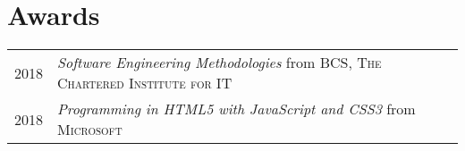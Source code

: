 \documentclass[a4paper,10pt]{article}
\begin{document}
\section{Awards}


\begin{tabular}{rl}
    \textsc{2018} & \textit{Software Engineering Methodologies} from \textsc{BCS, The Chartered Institute for IT}\\
    
    \textsc{2018} & \textit{Programming in HTML5 with JavaScript and CSS3} from \textsc{Microsoft}\\
\end{tabular}
\end{document}
